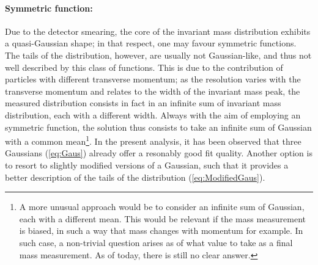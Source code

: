 \paragraph{Symmetric function:} Due to the detector smearing, the core of the invariant mass distribution exhibits a quasi-Gaussian shape; in that respect, one may favour symmetric functions. The tails of the distribution, however, are usually not Gaussian-like, and thus not well described by this class of functions. This is due to the contribution of particles with different transverse momentum; as the \pT resolution varies with the transverse momentum and relates to the width of the invariant mass peak, the measured distribution consists in fact in an infinite sum of invariant mass distribution, each with a different width. Always with the aim of employing an symmetric function, the solution thus consists to take an infinite sum of Gaussian with a common mean\footnote{A more unusual approach would be to consider an infinite sum of Gaussian, each with a different mean. This would be relevant if the mass measurement is biased, in such a way that mass changes with momentum for example. In such case, a non-trivial question arises as of what value to take as a final mass measurement. As of today, there is still no clear answer.}. In the present analysis, it has been observed that three Gaussians (\eq\ref{eq:Gaus}) already offer a resonably good fit quality. Another option is to resort to slightly modified versions of a Gaussian, such that it provides a better description of the tails of the distribution (\eq\ref{eq:ModifiedGaus}).

